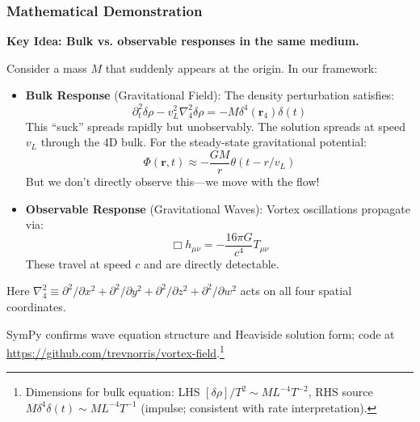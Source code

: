 \subsubsection{Mathematical Demonstration}

\textbf{Key Idea: Bulk vs. observable responses in the same medium.}

Consider a mass $M$ that suddenly appears at the origin. In our framework:

\begin{itemize}
\item \textbf{Bulk Response} (Gravitational Field): The density perturbation satisfies:
\begin{equation}
\partial_t^2 \delta\rho - v_L^2 \nabla_4^2 \delta\rho = -M\delta^4(\mathbf{r}_4)\delta(t)
\end{equation}
This ``suck'' spreads rapidly but unobservably. The solution spreads at speed $v_L$ through the 4D bulk. For the steady-state gravitational potential:
\begin{equation}
\Phi(\mathbf{r},t) \approx -\frac{GM}{r} \theta(t - r/v_L)
\end{equation}
But we don't directly observe this---we move with the flow!

\item \textbf{Observable Response} (Gravitational Waves): Vortex oscillations propagate via:
\begin{equation}
\Box h_{\mu\nu} = -\frac{16\pi G}{c^4} T_{\mu\nu}
\end{equation}
These travel at speed $c$ and are directly detectable.
\end{itemize}

Here $\nabla_4^2 \equiv \partial^2/\partial x^2 + \partial^2/\partial y^2 + \partial^2/\partial z^2 + \partial^2/\partial w^2$ acts on all four spatial coordinates.



SymPy confirms wave equation structure and Heaviside solution form; code at \url{https://github.com/trevnorris/vortex-field}.\footnote{Dimensions for bulk equation: LHS $[\delta\rho] / T^2 \sim M L^{-4} T^{-2}$, RHS source $M \delta^4 \delta(t) \sim M L^{-4} T^{-1}$ (impulse; consistent with rate interpretation).}

